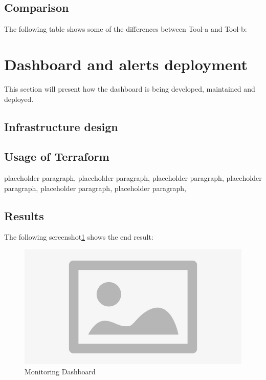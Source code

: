 \subsection{Comparison}

The following table shows some of the differences between Tool-a and Tool-b: 


\section{Dashboard and alerts deployment}
\qquad 

This section will present how the dashboard is being developed, maintained and deployed. 

\subsection{Infrastructure design}


\subsection{Usage of Terraform}

\qquad
placeholder paragraph, placeholder paragraph, placeholder paragraph, placeholder paragraph, placeholder paragraph, placeholder paragraph,

\subsection{Results}
The following screenshot\ref{fig:monitoring-dashboard} shows the end result: 

\begin{figure}[!h]
    \centering
    \includegraphics[scale=0.73]{figures/placeholder.png}
    \caption{Monitoring Dashboard}
    \label{fig:monitoring-dashboard}
\end{figure}

